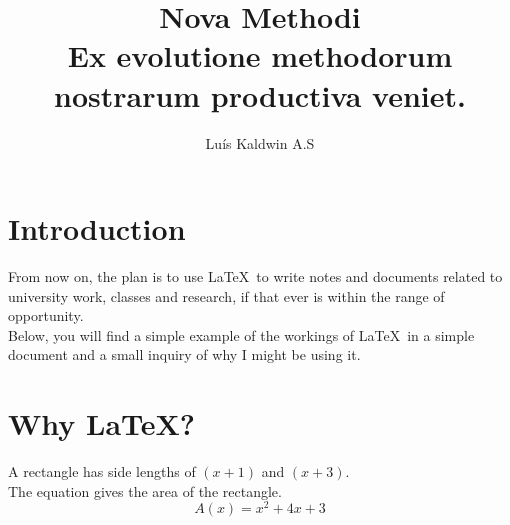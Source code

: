 \documentclass[11pt]{article}
\begin{document}
\title{Nova Methodi \\
    \large Ex evolutione methodorum nostrarum productiva veniet.}
\author{Luís Kaldwin A.S}
\maketitle

\section{Introduction}

From now on, the plan is to use \LaTeX\ to write notes and documents related to 
university work, classes and research, if that ever is within the range of opportunity. \\
Below, you will find a simple example of the workings of \LaTeX\ in a simple document and a small 
inquiry of why I might be using it. 

\section{Why \LaTeX?}
A rectangle has side lengths of $(x+1)$ and $(x+3)$. \\
The equation gives the area of the rectangle. \\
\[A(x) = x^2 + 4x + 3\]
\end{document}

